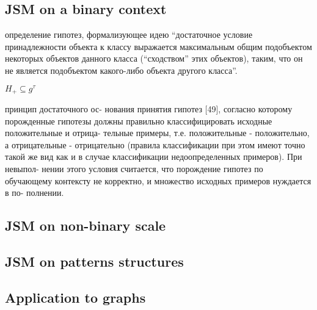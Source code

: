 \documentclass[a4paper]{article}
\begin{document}
\subsection{JSM on a binary context} %
\label{sub:dsm_on_a_binary_context}

определение гипотез, формализующее идею “достаточное условие принадлежности объекта к классу выражается максимальным общим подобъектом некоторых объектов данного класса (“сходством” этих объектов), таким, что он не является подобъектом какого-либо объекта другого класса”.

$H_+\subseteq g^\tau$

принцип достаточного ос-
нования принятия гипотез [49], согласно которому порожденные гипотезы
должны правильно классифицировать исходные положительные и отрица-
тельные примеры, т.е. положительные - положительно, а отрицательные -
отрицательно (правила классификации при этом имеют точно такой же вид
как и в случае классификации недоопределенных примеров). При невыпол-
нении этого условия считается, что порождение гипотез по обучающему
контексту не корректно, и множество исходных примеров нуждается в по-
полнении.


\subsection{JSM on non-binary scale} %
\label{sub:dsm_on_non_binary_scale}


\subsection{JSM on patterns structures} %
\label{sub:dsm_on_patterns_structures}


\subsection{Application to graphs} %
\label{sub:application_to_graphs}
\end{document}
